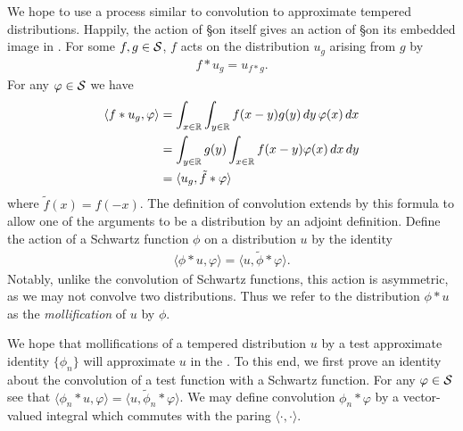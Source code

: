     We hope to use a process similar to convolution to approximate tempered distributions.
    Happily, the action of \S on itself gives an action of \S on its embedded image in \SS.
    For some $f,g\in\S$, $f$ acts on the distribution $u_g$ arising from $g$ by
    \begin{align*}
      f*u_g = u_{f*g} \text{.}
    \end{align*}
    For any $\varphi\in\S$ we have
    \begin{align*}
      \langle f*u_g, \varphi\rangle
      &= \int_{x\in\R} \int_{y\in\R} f(x-y)g(y)\,dy\,\varphi(x)\,dx
      \\&= \int_{y\in\R} g(y) \int_{x\in\R} f(x-y)\varphi(x)\,dx\,dy
      \\&= \langle u_g, \tilde f*\varphi\rangle
    \end{align*}
    where $\tilde f(x) = f(-x)$.
    The definition of convolution extends by this formula to allow one of the arguments to be a distribution by an adjoint definition.
    Define the action of a Schwartz function $\phi$ on a distribution $u$ by the identity
    \begin{align*}
      \langle \phi*u, \varphi\rangle
      = \langle u, \tilde\phi*\varphi\rangle \text{.}
    \end{align*}
    Notably, unlike the convolution of Schwartz functions, this action is asymmetric, as we may not convolve two distributions.
    Thus we refer to the distribution $\phi*u$ as the \emph{mollification} of $u$ by $\phi$.

    We hope that mollifications of a tempered distribution $u$ by a test approximate identity $\{\phi_n\}$ will approximate $u$ in the \ws.
    To this end, we first prove an identity about the convolution of a test function with a Schwartz function.
    For any $\varphi\in\S$ see that $\langle\phi_n*u,\varphi\rangle = \langle u, \tilde\phi_n*\varphi\rangle$.
    We may define convolution $\phi_n*\varphi$ by a vector-valued integral which commutes with the paring $\langle\cdot,\cdot\rangle$.

